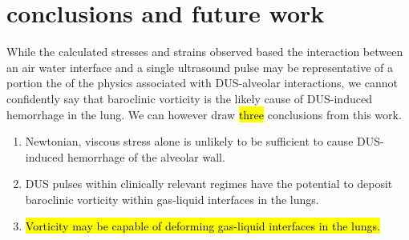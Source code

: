 \section{conclusions and future work}
While the calculated stresses and strains observed based the
interaction between an air water interface and a single ultrasound
pulse may be representative of a portion the of the physics associated
with \ac{DUS}-alveolar interactions, we cannot confidently say that
baroclinic vorticity is the likely cause of \ac{DUS}-induced
hemorrhage in the lung. We can however draw \hl{three} conclusions from this work. 
\begin{enumerate}
\item Newtonian, viscous stress alone is unlikely to be sufficient to cause \ac{DUS}-induced hemorrhage of the alveolar wall.
\item \ac{DUS} pulses within clinically relevant regimes have the potential to deposit baroclinic vorticity within gas-liquid interfaces in the lungs.
\item \hl{Vorticity may be capable of deforming gas-liquid interfaces in the lungs.}
\end{enumerate}














